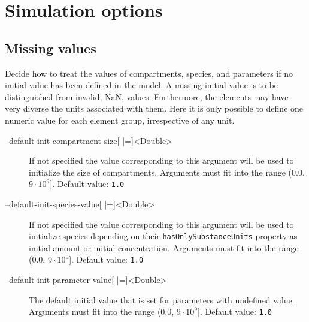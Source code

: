 \section{Simulation options}
\subsection{Missing values}
Decide how to treat the values of compartments, species, and parameters if no initial value has been defined in the model. A missing initial value is to be distinguished from invalid, \ie \ac{NaN}, values. Furthermore, the elements may have very diverse the units associated with them. Here it is only possible to define one numeric value for each element group, irrespective of any unit.
\begin{description}
\item[--default-init-compartment-size{[} |={]}<Double>]
          If not specified the value corresponding to this argument will
          be used to initialize the size of compartments.
          Arguments must fit into the range (0.0, $9\cdot 10^9${]}.
          Default value: \texttt{1.0}
\item[--default-init-species-value{[} |={]}<Double>]
          If not specified the value corresponding to this argument will
          be used to initialize species depending on their \texttt{hasOnlySubstanceUnits}
          property as initial amount or initial concentration.
          Arguments must fit into the range (0.0, $9\cdot 10^9${]}.
          Default value: \texttt{1.0}
\item[--default-init-parameter-value{[} |={]}<Double>]
          The default initial value that is set for parameters with undefined value.
          Arguments must fit into the range (0.0, $9\cdot 10^9${]}.
          Default value: \texttt{1.0}
\end{description}

